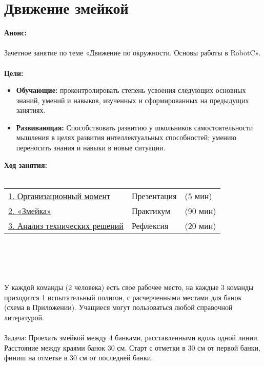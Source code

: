 \chapter{Движение змейкой}
{\bfseries Анонс:}\\\\
Зачетное занятие по теме «Движение по окружности. Основы работы в RobotC».\\\\
{\bfseries Цели:}
\begin{itemize}
	\item{}{\bfseries Обучающие:} проконтролировать степень усвоения следующих основных знаний, умений и навыков, изученных и сформированных на предыдущих занятиях.
	\item{}{\bfseries Развивающая:} Способствовать развитию  у школьников самостоятельности мышления в целях развития интеллектуальных способностей; умению переносить знания и навыки в новые ситуации.\\
\end{itemize}	
{\bfseries Ход занятия:}\\\\
\begin{tabular}{lll}
	\hyperlink{lesson13x1}{1. Организационный момент} & Презентация & (5 мин)\\
	\hyperlink{lesson13x2}{2. «Змейка»} & Практикум & (90 мин) \\
	\hyperlink{lesson13x3}{3. Анализ технических решений} & Рефлексия & (20 мин) \\
\end{tabular}\\\\

{\hypertarget{lesson13x1}{}}\\\\ 

У каждой команды (2 человека) есть свое рабочее место, на каждые 3 команды приходится 1 испытательный полигон, с расчерченными местами для банок (схема в Приложении). Учащиеся могут пользоваться любой справочной литературой.
\clearpage
{\hypertarget{lesson13x2}{}}\\\\

Задача: Проехать змейкой между 4 банками, расставленными вдоль одной линии. Расстояние между краями банок 30 см. Старт с отметки в 30 см от первой банки, финиш на отметке в 30 см от последней банки.\\\\


